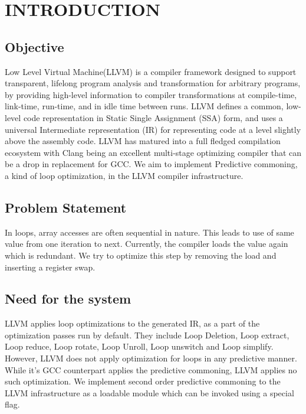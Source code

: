 
\chapter{INTRODUCTION} %
\section{Objective} %
Low Level Virtual Machine(LLVM)\cite{Lattner:2004:LCF:977395.977673} is a compiler framework designed to support transparent, lifelong program analysis and transformation for arbitrary programs, by providing high-level information to compiler transformations at compile-time, link-time, run-time, and in idle time between runs. LLVM defines a common, low-level code representation in Static Single Assignment (SSA) form, and uses a universal Intermediate representation (IR) for representing code at a level slightly above the assembly code. LLVM has matured into a full fledged compilation ecosystem with Clang being an excellent multi-stage optimizing compiler that can be a drop in replacement for GCC. We aim to implement Predictive commoning, a kind of loop optimization, in the LLVM compiler infrastructure.

\section{Problem Statement}
In loops, array accesses are often sequential in nature. This leads to use of same value from one iteration to next. Currently, the compiler loads the  value again which is redundant. We try to optimize this step by removing the load and inserting a register swap. 

\section{Need for the system}
LLVM applies loop optimizations to the generated IR, as a part of the optimization passes run by default. They include Loop Deletion, Loop extract, Loop reduce, Loop rotate, Loop Unroll, Loop unswitch and Loop simplify. However, LLVM does not apply optimization for loops in any predictive manner. While it's GCC counterpart applies the predictive commoning, LLVM applies no such optimization. We implement second order predictive commoning to the LLVM infrastructure as a loadable module which can be invoked using a special flag.


